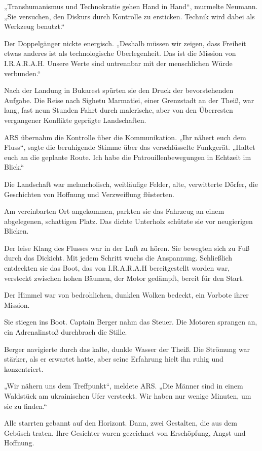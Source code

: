 \documentclass[
]{article}
\begin{document}
„Transhumanismus und Technokratie gehen Hand in Hand``, murmelte Neumann. „Sie versuchen, den Diskurs durch Kontrolle zu ersticken. Technik wird dabei als Werkzeug benutzt.``

Der Doppelgänger nickte energisch. „Deshalb müssen wir zeigen, dass Freiheit etwas anderes ist als technologische Überlegenheit. Das ist die Mission von I.R.A.R.A.H. Unsere Werte sind untrennbar mit der menschlichen Würde verbunden.``

Nach der Landung in Bukarest spürten sie den Druck der bevorstehenden Aufgabe. Die Reise nach Sighetu Marmatiei, einer Grenzstadt an der Theiß, war lang, fast neun Stunden Fahrt durch malerische, aber von den Überresten vergangener Konflikte geprägte Landschaften.

ARS übernahm die Kontrolle über die Kommunikation. „Ihr nähert euch dem Fluss``, sagte die beruhigende Stimme über das verschlüsselte Funkgerät. „Haltet euch an die geplante Route. Ich habe die Patrouillenbewegungen in Echtzeit im Blick.``

Die Landschaft war melancholisch, weitläufige Felder, alte, verwitterte Dörfer, die Geschichten von Hoffnung und Verzweiflung flüsterten.

Am vereinbarten Ort angekommen, parkten sie das Fahrzeug an einem abgelegenen, schattigen Platz. Das dichte Unterholz schützte sie vor neugierigen Blicken.

Der leise Klang des Flusses war in der Luft zu hören. Sie bewegten sich zu Fuß durch das Dickicht. Mit jedem Schritt wuchs die Anspannung. Schließlich entdeckten sie das Boot, das von I.R.A.R.A.H bereitgestellt worden war, versteckt zwischen hohen Bäumen, der Motor gedämpft, bereit für den Start.

Der Himmel war von bedrohlichen, dunklen Wolken bedeckt, ein Vorbote ihrer Mission.

Sie stiegen ins Boot. Captain Berger nahm das Steuer. Die Motoren sprangen an, ein Adrenalinstoß durchbrach die Stille.

Berger navigierte durch das kalte, dunkle Wasser der Theiß. Die Strömung war stärker, als er erwartet hatte, aber seine Erfahrung hielt ihn ruhig und konzentriert.

„Wir nähern uns dem Treffpunkt``, meldete ARS. „Die Männer sind in einem Waldstück am ukrainischen Ufer versteckt. Wir haben nur wenige Minuten, um sie zu finden.``

Alle starrten gebannt auf den Horizont. Dann, zwei Gestalten, die aus dem Gebüsch traten. Ihre Gesichter waren gezeichnet von Erschöpfung, Angst und Hoffnung.
\end{document}
